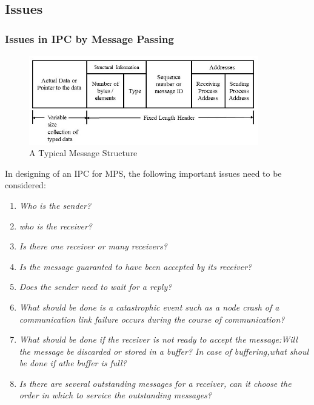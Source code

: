\documentclass{beamer}
\begin{document}
\subsection{Issues}
\begin{frame}[allowframebreaks]
	\frametitle{Issues in IPC by Message Passing}
	\begin{figure}
		\centering
		\includegraphics[width=10cm]{messageStructure.jpg}
		\caption{A Typical Message Structure}
	\end{figure}
	\framebreak
	In designing of an IPC for MPS, the following important issues need to be considered:
	\begin{enumerate}
		\item \textit{Who is the sender?}
		\item \textit{who is the receiver?}
		\item \textit{Is there one receiver or many receivers?}
		\item \textit{Is the message guaranted to have been accepted by its receiver?}
		\item \textit{Does the sender need to wait for a reply?}
		\item \textit{What should be done is a catastrophic event such as a node crash of a communication link failure occurs during the course of 
		communication?}
		\item \textit{What should be done if the receiver is not ready to accept the message:Will the message be discarded or stored in a buffer? In case 
		of buffering,what shoul be done if athe buffer is full?}
		\item \textit{Is there are several outstanding messages for a receiver, can it choose the order in which to service the outstanding messages?}
	\end{enumerate}	
\end{frame}
\end{document}

